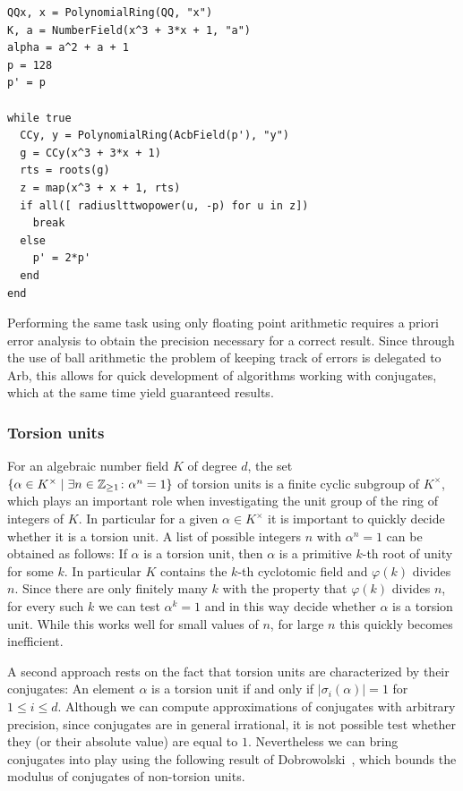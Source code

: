 \documentclass{sig-alternate-05-2015}
\begin{document}
\begin{verbatim}
QQx, x = PolynomialRing(QQ, "x")
K, a = NumberField(x^3 + 3*x + 1, "a")
alpha = a^2 + a + 1
p = 128
p' = p

while true
  CCy, y = PolynomialRing(AcbField(p'), "y")
  g = CCy(x^3 + 3*x + 1)
  rts = roots(g)
  z = map(x^3 + x + 1, rts)
  if all([ radiuslttwopower(u, -p) for u in z])
    break
  else
    p' = 2*p'
  end
end
\end{verbatim}

Performing the same task using only floating point arithmetic requires a priori error analysis to obtain the precision necessary for a correct result.
Since through the use of ball arithmetic the problem of keeping track of errors is delegated to Arb, this allows for quick development of algorithms working with conjugates, which at the same time yield guaranteed results.

\subsubsection{Torsion units}

For an algebraic number field $K$ of degree $d$, the set $\{ \alpha \in K^\times \mid \exists n \in \mathbb{Z}_{\geq 1} \colon \alpha^n = 1 \}$ of torsion units is a finite cyclic subgroup of $K^\times$, which plays an important role
when investigating the unit group of the ring of integers of $K$.
In particular for a given $\alpha \in K^\times$ it is important to quickly decide whether it is a torsion unit.
A list of possible integers $n$ with $\alpha^n = 1$ can be obtained as follows:
If $\alpha$ is a torsion unit, then $\alpha$ is a primitive $k$-th root of unity for some $k$.
In particular $K$ contains the $k$-th cyclotomic field and $\varphi(k)$ divides $n$.
Since there are only finitely many $k$ with the property that $\varphi(k)$ divides $n$, for every such $k$ we can test $\alpha^k = 1$ and in this way decide whether $\alpha$ is a torsion unit.
While this works well for small values of $n$, for large $n$ this quickly becomes inefficient.

A second approach rests on the fact that torsion units are characterized by their conjugates: An element $\alpha$ is a torsion unit if and only if $\lvert \sigma_i(\alpha) \rvert = 1$ for $1 \leq i \leq d$.
Although we can compute approximations of conjugates with arbitrary precision, since conjugates are in general irrational, it is not possible test whether they (or their absolute value) are equal to $1$.
Nevertheless we can bring conjugates into play using the following result of Dobrowolski~\cite{Dobrowolski1978}, which bounds the modulus of conjugates of non-torsion units.
\end{document}
